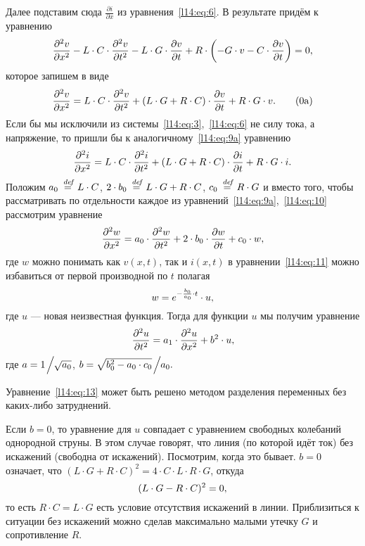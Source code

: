 \documentclass[12pt,a4paper,openany,fleqn]{book}
\newcommand {\defeq}{\stackrel{\hspace{0.09 cm}de\!f}{=}}
\newcommand {\eqdef}{\defeq}
\newcommand{\pder}[2]{\ensuremath{\frac{\partial#1}{\partial#2}}}
\newcommand{\pdder}[2]{\ensuremath{\frac{\partial^2#1}{\partial#2^2}}}
\theoremstyle{definition}
\begin{document}
	Далее подставим сюда $\displaystyle\pder{i}{x}$ из уравнения~\eqref{l14:eq:6}. В результате придём к уравнению
	\begin{equation*}
	 	\hfill \pdder{v}{x}-L\cdot C\cdot\pdder{v}{t}-L\cdot G\cdot \pder{v}{t}+R\cdot \left(-G\cdot v-C\cdot\pder{v}{t}\right)=0,\hfill
	\end{equation*}  
	которое запишем в виде
	\begin{equation}\label{l14:eq:9a}
		\hfill \pdder{v}{x}=L\cdot C\cdot\pdder{v}{t}+(L\cdot G+R\cdot C)\cdot\pder{v}{t}+R\cdot G\cdot v.\tag{\theequation a}\hfill
	\end{equation} 
	Если бы мы исключили из системы~\eqref{l14:eq:3},~\eqref{l14:eq:6} не силу тока, а напряжение, то пришли бы к аналогичному~\eqref{l14:eq:9a} уравнению
	\begin{equation}\label{l14:eq:10}
		\hfill \pdder{i}{x}=L\cdot C\cdot\pdder{i}{t}+(L\cdot G +R\cdot C)\cdot\pder{i}{t}+R\cdot G\cdot i.\hfill
	\end{equation} 
	Положим $a_0\eqdef L\cdot C$, $2\cdot b_0\eqdef L\cdot G +R\cdot C$, $c_0\eqdef R\cdot G$ и вместо того, чтобы рассматривать по отдельности каждое из уравнений~\eqref{l14:eq:9a},~\eqref{l14:eq:10} рассмотрим уравнение 
	\begin{equation}\label{l14:eq:11}
		\hfill \pdder{w}{x}=a_0\cdot\pdder{w}{t}+2\cdot b_0\cdot\pder{w}{t}+c_0\cdot w,\hfill
	\end{equation} 
	где $w$ можно понимать как $v(x,t)$, так и $i(x,t)$ в уравнении~\eqref{l14:eq:11} можно избавиться от первой производной по $t$ полагая 
	\begin{equation}\label{l14:eq:12}
		\hfill w=e^{-\frac{b_0}{a_0}\cdot t}\cdot u, \hfill
	\end{equation}
	где $u$ --- новая неизвестная функция. Тогда для функции $u$ мы получим уравнение
	\begin{equation}\label{l14:eq:13}
		\hfill \pdder{u}{t}=a_1\cdot\pdder{u}{x}+b^2\cdot u,\hfill
	\end{equation} 
	где $a=1\!\Bigm/\!\!\sqrt{a_0}$, $b=\sqrt{b_0^2-a_0\cdot c_0}\!\Bigm/\!\!a_0.$
	
	Уравнение~\eqref{l14:eq:13} может быть решено методом разделения переменных без каких-либо затруднений.
	
	Если $b=0$, то уравнение для $u$ совпадает с уравнением свободных колебаний однородной струны. В этом случае говорят, что линия (по которой идёт ток) без искажений (свободна от искажений). Посмотрим, когда это бывает. $b=0$ означает, что $(L\cdot G+R\cdot C)^2=4\cdot C\cdot L\cdot R\cdot G$, откуда 
	\begin{equation*}
		\hfill(L\cdot G-R\cdot C)^2=0,\hfill
	\end{equation*}
	то есть $R\cdot C=L\cdot G$ есть условие отсутствия искажений в линии. Приблизиться к ситуации без искажений можно сделав максимально малыми утечку $G$ и сопротивление $R$.
\end{document}
